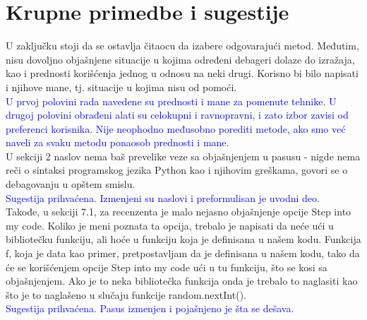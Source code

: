 \documentclass[a4paper]{report}
\newcommand{\odgovor}[1]{\textcolor{blue}{#1}}
\begin{document}
\section{Krupne primedbe i sugestije}
U zaključku stoji da se ostavlja čitaocu da izabere odgovarajući metod. Međutim, nisu dovoljno objašnjene situacije u kojima određeni debageri dolaze do izražaja, kao i prednosti korišćenja jednog u odnosu na neki drugi. Korisno bi bilo napisati i njihove mane, tj. situacije u kojima nisu od pomoći.\\
\odgovor{U prvoj polovini rada navedene su prednosti i mane za pomenute tehnike. U drugoj polovini obrađeni alati su celokupni i ravnopravni, i zato izbor zavisi od preferenci korisnika. Nije neophodno međusobno porediti metode, ako smo već naveli za svaku metodu ponaosob prednosti i mane.}
\\
U sekciji 2 naslov  nema baš prevelike veze sa objašnjenjem u pasusu - nigde nema reči o sintaksi programskog jezika Python kao i njihovim greškama, govori se o debagovanju u opštem smislu. \\
\odgovor{Sugestija prihvaćena. Izmenjeni su naslovi i preformulisan je uvodni deo.}
\\
Takođe, u sekciji 7.1,  za recenzenta je malo nejasno objašnjenje opcije Step into my code. Koliko je meni poznata ta opcija, trebalo je napisati da neće ući u bibliotečku funkciju, ali hoće u funkciju koja je definisana u našem kodu. Funkcija f, koja je data kao primer, pretpostavljam da je definisana u našem kodu, tako da će se korišćenjem opcije Step into my code ući u tu funkciju, što se kosi sa objašnjenjem. Ako je to neka bibliotečka funkcija onda je trebalo to naglasiti kao što je to naglašeno u slučaju funkcije random.nextInt(). \\
\odgovor{Sugestija prihvaćena. Pasus izmenjen i pojašnjeno je šta se dešava.}
\end{document}
